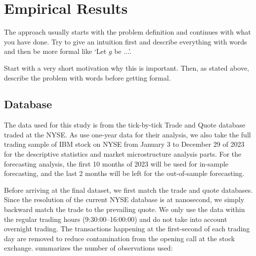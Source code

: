 \chapter{Empirical Results}\label{chap:mainresults}
 The approach usually starts with the problem definition and continues with what you have done. Try to give an intuition first and describe everything with words and then be more formal like `Let $g$ be ...'.

Start with a very short motivation why this is important. Then, as stated above, describe the problem with words before getting formal.
\section{Database}

The data used for this study is from the tick-by-tick Trade and Quote database traded at the NYSE. As \citet{hausman1992} use one-year data for their analysis, we also take the full trading sample of IBM stock on NYSE from January 3 to December 29 of 2023 for the descriptive statistics and market microstructure analysis parts. For the forecasting analysis, the first 10 months of 2023 will be used for in-sample forecasting, and the last 2 months will be left for the out-of-sample forecasting.

Before arriving at the final dataset, we first match the trade and quote databases. Since the resolution of the current NYSE database is at nanosecond, we simply backward match the trade to the prevailing quote. We only use the data within the regular trading hours (9:30:00–16:00:00) and do not take into account overnight trading. The transactions happening at the first-second of each trading day are removed to reduce contamination from the opening call at the stock exchange.  summarizes the number of observations used:

\begin{table}[ht]
\centering
\small
\renewcommand{\arraystretch}{1.3} %
\setlength{\tabcolsep}{10pt} %
\caption{Summary of Database: IBM traded on NYSE, 2023}
\label{tab:table-2}
\end{table}


